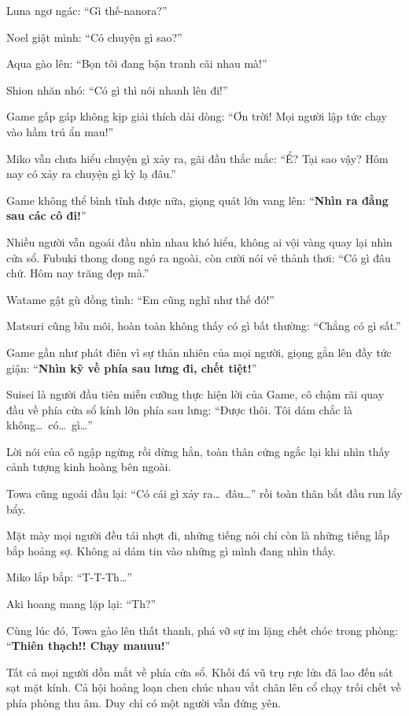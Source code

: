 \documentclass[../main.tex]{subfiles}
\begin{document}
Luna ngơ ngác: ``Gì thế-nanora?''

Noel giật mình: ``Có chuyện gì sao?''

Aqua gào lên: ``Bọn tôi đang bận tranh cãi nhau mà!''

Shion nhăn nhó: ``Có gì thì nói nhanh lên đi!''

Game gấp gáp không kịp giải thích dài dòng: ``Ơn trời! Mọi người lập tức chạy vào hầm trú ẩn mau!''

Miko vẫn chưa hiểu chuyện gì xảy ra, gãi đầu thắc mắc: ``Ể? Tại sao vậy? Hôm nay có xảy ra chuyện gì kỳ lạ đâu.''

Game không thể bình tĩnh được nữa, giọng quát lớn vang lên: ``\textbf{Nhìn ra đằng sau các cô đi!}''

Nhiều người vẫn ngoái đầu nhìn nhau khó hiểu, không ai vội vàng quay lại nhìn cửa sổ. Fubuki thong dong ngó ra ngoài, còn cười nói vẻ thảnh thơi: ``Có gì đâu chứ. Hôm nay trăng đẹp mà.''

Watame gật gù đồng tình: ``Em cũng nghĩ như thế đó!''

Matsuri cũng bĩu môi, hoàn toàn không thấy có gì bất thường: ``Chẳng có gì sất.''

Game gần như phát điên vì sự thản nhiên của mọi người, giọng gằn lên đầy tức giận: ``\textbf{Nhìn kỹ về phía sau lưng đi, chết tiệt!}''

Suisei là người đầu tiên miễn cưỡng thực hiện lời của Game, cô chậm rãi quay đầu về phía cửa sổ kính lớn phía sau lưng: ``Được thôi. Tôi dám chắc là không\dots\ có\dots\ gì\dots''

Lời nói của cô ngập ngừng rồi dừng hẳn, toàn thân cứng ngắc lại khi nhìn thấy cảnh tượng kinh hoàng bên ngoài.

Towa cũng ngoái đầu lại: ``Có cái gì xảy ra\dots\ đâu\dots'' rồi toàn thân bắt đầu run lẩy bẩy.

Mặt mày mọi người đều tái nhợt đi, những tiếng nói chỉ còn là những tiếng lắp bắp hoảng sợ. Không ai dám tin vào những gì mình đang nhìn thấy.

Miko lắp bắp: ``T-T-Th\dots''

Aki hoang mang lặp lại: ``Th?''

Cùng lúc đó, Towa gào lên thất thanh, phá vỡ sự im lặng chết chóc trong phòng: ``\textbf{Thiên thạch!! Chạy mauuu!}''

Tất cả mọi người dồn mắt về phía cửa sổ. Khối đá vũ trụ rực lửa đã lao đến sát sạt mặt kính. Cả hội hoảng loạn chen chúc nhau vắt chân lên cổ chạy trối chết về phía phòng thu âm. Duy chỉ có một người vẫn đứng yên.
\end{document}
